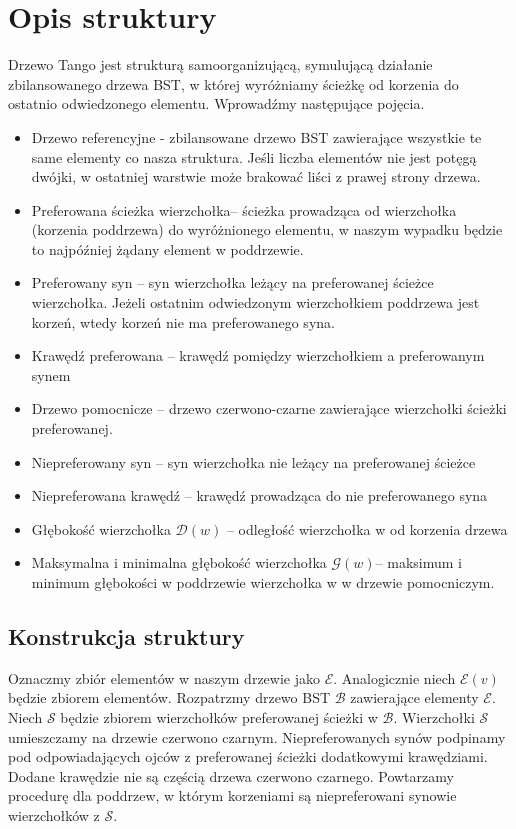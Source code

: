 \documentclass[declaration,shortabstract]{iithesis}
\theoremstyle{thm}
\theoremstyle{remark}
\theoremstyle{plain}
\theoremstyle{plain}
\theoremstyle{plain}
\begin{document}
 \section{Opis struktury} 
Drzewo Tango jest strukturą samoorganizującą, symulującą działanie zbilansowanego drzewa BST, w której wyróżniamy ścieżkę od korzenia do ostatnio odwiedzonego elementu.  Wprowadźmy następujące pojęcia. 
 \begin{itemize} 
 \item{Drzewo referencyjne - zbilansowane drzewo BST zawierające wszystkie te same elementy co nasza struktura. Jeśli liczba elementów nie jest potęgą dwójki, w ostatniej warstwie może brakować liści z prawej strony drzewa.} 
 \item{Preferowana ścieżka wierzchołka– ścieżka prowadząca od wierzchołka (korzenia poddrzewa) do wyróżnionego elementu, w naszym wypadku będzie to najpóźniej  żądany element w poddrzewie.} 
 \item{Preferowany syn – syn wierzchołka leżący na preferowanej ścieżce wierzchołka. Jeżeli ostatnim odwiedzonym wierzchołkiem poddrzewa jest korzeń, wtedy korzeń nie ma preferowanego syna.} 
 \item{Krawędź preferowana – krawędź pomiędzy wierzchołkiem a preferowanym synem} \item{Drzewo pomocnicze -- drzewo czerwono-czarne zawierające wierzchołki ścieżki preferowanej.} 
 \item{Niepreferowany syn – syn wierzchołka nie leżący na preferowanej ścieżce} 
 \item{Niepreferowana krawędź – krawędź prowadząca do nie preferowanego syna} 
 \item{Głębokość wierzchołka \(\mathcal{D}(w)\) -- odległość wierzchołka w od korzenia drzewa} 
 \item{Maksymalna i minimalna głębokość wierzchołka \(\mathcal{G}(w)\)-- maksimum i minimum głębokości w poddrzewie wierzchołka w w drzewie pomocniczym.} 
 \end{itemize} 
 \subsection{Konstrukcja struktury}  

Oznaczmy zbiór elementów w naszym drzewie jako \(\mathcal{E}\). Analogicznie niech \(\mathcal{E}(v)\) będzie zbiorem elementów. Rozpatrzmy drzewo BST \(\mathcal{B}\) zawierające elementy \(\mathcal{E}\). Niech \( \mathcal{S}\) będzie zbiorem wierzchołków preferowanej ścieżki w \(\mathcal{B}\). Wierzchołki \(\mathcal{S}\) umieszczamy na drzewie czerwono czarnym. Niepreferowanych synów podpinamy pod odpowiadających ojców z preferowanej ścieżki dodatkowymi krawędziami. Dodane krawędzie nie są częścią drzewa czerwono czarnego. Powtarzamy procedurę dla poddrzew, w którym korzeniami są niepreferowani synowie wierzchołków z \(\mathcal{S}\).  
\end{document}
